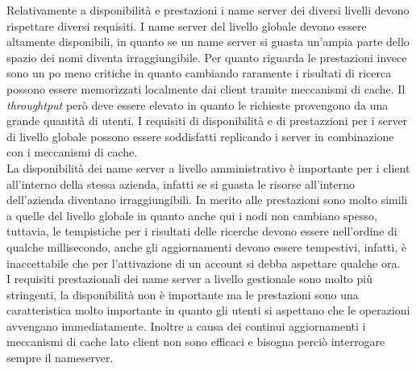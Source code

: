 Relativamente a disponibilità e prestazioni i name server dei diversi livelli devono rispettare diversi requisiti. I name server del livello globale devono essere altamente disponibili, in quanto se un name server si guasta un'ampia parte dello spazio dei nomi diventa irraggiungibile. Per quanto riguarda le prestazioni invece sono un po meno critiche in quanto cambiando raramente i risultati di ricerca possono essere memorizzati localmente dai client tramite meccanismi di cache. Il \emph{throughtput} però deve essere elevato in quanto le richieste provengono da una grande quantità di utenti. I requisiti di disponibilità e di prestazzioni per i server di livello globale possono essere soddisfatti replicando i server in combinazione con i meccanismi di cache.\\
La disponibilità dei name server a livello amministrativo è importante per i client all'interno della stessa azienda, infatti se si guasta le risorse all'interno dell'azienda diventano irraggiungibili. In merito alle prestazioni sono molto simili a quelle del livello globale in quanto anche qui i nodi non cambiano spesso, tuttavia, le tempistiche per i risultati delle ricerche devono essere nell'ordine di qualche millisecondo, anche gli aggiornamenti devono essere tempestivi, infatti, è inaccettabile che per l'attivazione di un account si debba aspettare qualche ora.\\
I requisiti prestazionali dei name server a livello gestionale sono molto più stringenti, la disponibilità non è importante ma le prestazioni sono una caratteristica molto importante in quanto gli utenti si aspettano che le operazioni avvengano immediatamente. Inoltre a causa dei continui aggiornamenti i meccanismi di cache lato client non sono efficaci e bisogna perciò interrogare sempre il nameserver.
